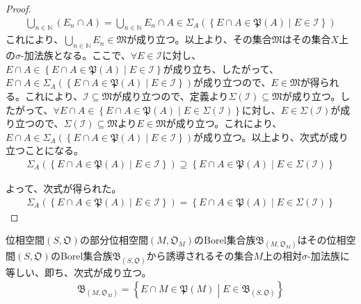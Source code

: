 \documentclass[dvipdfmx]{jsarticle}
\begin{document}
\begin{proof}
\begin{align*}
\bigcup_{n \in \mathbb{N}} \left( E_{n} \cap A \right) = \bigcup_{n \in \mathbb{N}} E_{n} \cap A \in \varSigma_{A}\left( \left\{ E \cap A \in \mathfrak{P}(A) \middle| E\in \mathcal{I} \right\} \right)
\end{align*}
これにより、$\bigcup_{n \in \mathbb{N}} E_{n}\in \mathfrak{M}$が成り立つ。以上より、その集合$\mathfrak{M}$はその集合$X$上の$\sigma$-加法族となる。ここで、$\forall E\in \mathcal{I}$に対し、$E \cap A \in \left\{ E \cap A \in \mathfrak{P}(A) \middle| E\in \mathcal{I} \right\}$が成り立ち、したがって、$E \cap A \in \varSigma_{A}\left( \left\{ E \cap A \in \mathfrak{P}(A) \middle| E\in \mathcal{I} \right\} \right)$が成り立つので、$E \in \mathfrak{M}$が得られる。これにより、$\mathcal{I \subseteq}\mathfrak{M}$が成り立つので、定義より$\varSigma\left( \mathcal{I} \right)\subseteq \mathfrak{M}$が成り立つ。したがって、$\forall E \cap A \in \left\{ E \cap A \in \mathfrak{P}(A) \middle| E \in \varSigma\left( \mathcal{I} \right) \right\}$に対し、$E \in \varSigma\left( \mathcal{I} \right)$が成り立つので、$\varSigma\left( \mathcal{I} \right)\subseteq \mathfrak{M}$より$E \in \mathfrak{M}$が成り立つ。これにより、$E \cap A \in \varSigma_{A}\left( \left\{ E \cap A \in \mathfrak{P}(A) \middle| E\in \mathcal{I} \right\} \right)$が成り立つ。以上より、次式が成り立つことになる。
\begin{align*}
\varSigma_{A}\left( \left\{ E \cap A \in \mathfrak{P}(A) \middle| E\in \mathcal{I} \right\} \right) \supseteq \left\{ E \cap A \in \mathfrak{P}(A) \middle| E \in \varSigma\left( \mathcal{I} \right) \right\}
\end{align*}\par
よって、次式が得られた。
\begin{align*}
\varSigma_{A}\left( \left\{ E \cap A \in \mathfrak{P}(A) \middle| E\in \mathcal{I} \right\} \right) = \left\{ E \cap A \in \mathfrak{P}(A) \middle| E \in \varSigma\left( \mathcal{I} \right) \right\}
\end{align*}
\end{proof}
\begin{thm}\label{4.5.2.9}
位相空間$\left( S,\mathfrak{O} \right)$の部分位相空間$\left( M,\mathfrak{O}_{M} \right)$のBorel集合族$\mathfrak{B}_{\left( M,\mathfrak{O}_{M} \right)}$はその位相空間$\left( S,\mathfrak{O} \right)$のBorel集合族$\mathfrak{B}_{\left( S,\mathfrak{O} \right)}$から誘導されるその集合$M$上の相対$\sigma$-加法族に等しい、即ち、次式が成り立つ。
\begin{align*}
\mathfrak{B}_{\left( M,\mathfrak{O}_{M} \right)} = \left\{ E \cap M \in \mathfrak{P}(M) \middle| E \in \mathfrak{B}_{\left( S,\mathfrak{O} \right)} \right\}
\end{align*}
\end{thm}
\end{document}
